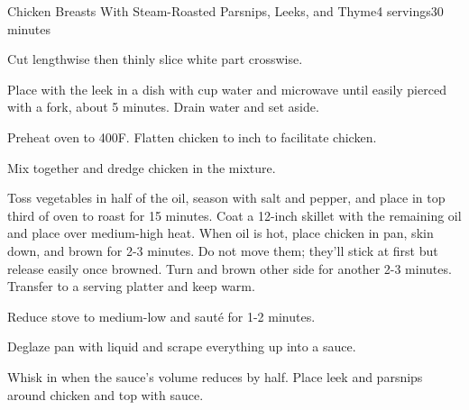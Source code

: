 \documentclass[../Cookbook.tex]{subfiles}
\begin{document}
\begin{recipe}{Chicken Breasts With Steam-Roasted Parsnips, Leeks, and Thyme}{4 servings}{30 minutes}

Cut lengthwise then thinly slice white part crosswise.

Place with the leek in a dish with  cup water and microwave until easily pierced with a fork, about 5 minutes. Drain water and set aside.

Preheat oven to 400\0F. Flatten chicken to  inch to facilitate chicken.

Mix together and dredge chicken in the mixture.

Toss vegetables in half of the oil, season with salt and pepper, and place in top third of oven to roast for 15 minutes.
Coat a 12-inch skillet with the remaining oil and place over medium-high heat. When oil is hot, place chicken in pan, skin down, and brown for 2-3 minutes. Do not move them; they'll stick at first but release easily once browned. Turn and brown other side for another 2-3 minutes. Transfer to a serving platter and keep warm.

Reduce stove to medium-low and saut\'e for 1-2 minutes.

Deglaze pan with liquid and scrape everything up into a sauce.

Whisk in when the sauce's volume reduces by half. Place leek and parsnips around chicken and top with sauce.

\end{recipe}
\end{document}
